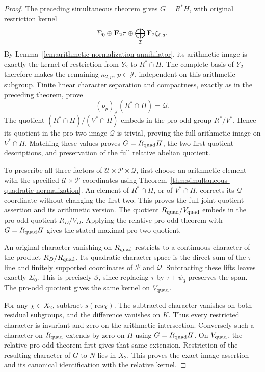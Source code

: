 \begin{proof}
The preceding simultaneous theorem gives \(G=R^*H\), with original
restriction kernel
\[
 \Sigma_0\oplus\mathbf F_2\tau\oplus
                       \bigoplus_{\mathcal I}\mathbf F_2\xi_{\ell,q}.
\]
By Lemma~\ref{lem:arithmetic-normalization-annihilator}, its arithmetic
image is exactly the kernel of restriction from \(Y_2\) to
\(R^*\cap H\). The complete basis of \(Y_2\) therefore makes the
remaining \(\kappa_{2,p}\), \(p\in\mathcal J\), independent on
this arithmetic subgroup. Finite linear character separation and
compactness, exactly as in the preceding theorem, prove
\[
               (\nu_p)_{\mathcal J}(R^*\cap H)=\mathcal Q.
\]
The quotient \((R^*\cap H)/(V^*\cap H)\) embeds in the pro-odd
group \(R^*/V^*\). Hence its quotient in the pro-two image
\(\mathcal Q\) is trivial, proving the full arithmetic image on
\(V^*\cap H\). Matching these values proves
\(G=R_{\rm quad}H\), the two first quotient descriptions, and
preservation of the full relative abelian quotient.

To prescribe all three factors of
\(\mathcal U\times\mathcal P\times\mathcal Q\), first choose an
arithmetic element with the specified \(\mathcal U\times\mathcal P\)
coordinates using Theorem~\ref{thm:simultaneous-quadratic-normalization}.
An element of \(R^*\cap H\), or of \(V^*\cap H\), corrects its
\(\mathcal Q\)-coordinate without changing the first two. This proves
the full joint quotient assertion and its arithmetic version.
The quotient \(R_{\rm quad}/V_{\rm quad}\) embeds in the pro-odd
quotient \(R_D/V_D\). Applying the relative pro-odd theorem with
\(G=R_{\rm quad}H\) gives the stated maximal pro-two quotient.

An original character vanishing on \(R_{\rm quad}\) restricts to
a continuous character of the product
\(R_D/R_{\rm quad}\). Its quadratic character space is the direct
sum of the \(\tau\)-line and finitely supported coordinates of
\(\mathcal P\) and \(\mathcal Q\). Subtracting these lifts leaves
exactly \(\Sigma_0\). This is precisely \(\mathcal S\), since
replacing \(\tau\) by \(\tau+\psi_3\) preserves the span.
The pro-odd quotient gives the same kernel on \(V_{\rm quad}\).

For any \(\chi\in X_2\), subtract \(s(\mathrm{res}\chi)\).
The subtracted character vanishes on both residual subgroups, and
the difference vanishes on \(K\). Thus every restricted character
is invariant and zero on the arithmetic intersection. Conversely
such a character on \(R_{\rm quad}\) extends by zero on \(H\)
using \(G=R_{\rm quad}H\). On \(V_{\rm quad}\), the relative
pro-odd theorem first gives that same extension. Restriction of the
resulting character of \(G\) to \(N\) lies in \(X_2\).
This proves the exact image assertion and its canonical
identification with the relative kernel.
\end{proof}
